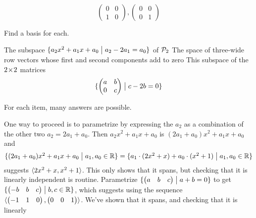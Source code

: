 \begin{exercises}
\begin{answer}
\begin{equation*}
{           \begin{pmatrix}
             0  &0  \\
             1  &0
           \end{pmatrix},
           \begin{pmatrix}
             0  &0  \\
             0  &1
           \end{pmatrix}  }
      \end{equation*} 
    \end{answer}
  \recommended \item 
      Find a basis for each.
      \begin{exparts}
        \partsitem The subspace $\mbox{$\{a_2x^2+a_1x+a_0\bigm| a_2-2a_1=a_0\}$}$ 
          of $\mathcal{P}_2$
        \partsitem The space of three-wide row vectors whose first and second
          components add to zero
        \partsitem This subspace of the $2 \! \times \! 2$ matrices
          \begin{equation*}
            \mbox{$\{\begin{pmatrix}
                   a  &b  \\
                   0  &c  
                 \end{pmatrix} \bigm| c-2b=0\}$}
          \end{equation*}
      \end{exparts}
      \begin{answer}
        For each item, many answers are possible.
        \begin{exparts}
          \partsitem One way to proceed is to parametrize by
            expressing the $a_2$ as a combination of the other two
            $a_2=2a_1+a_0$.
            Then
            $a_2x^2+a_1x+a_0$ is $(2a_1+a_0)x^2+a_1x+a_0$ and
            \begin{equation*} 
              \mbox{$\{(2a_1+a_0)x^2+a_1x+a_0\bigm| a_1,a_0\in\mathbb{R}\}$}
              =\mbox{$\{a_1\cdot(2x^2+x)+a_0\cdot(x^2+1)\bigm| a_1,a_0\in\mathbb{R}\}$}
            \end{equation*}
            suggests 
            $\langle2x^2+x,x^2+1\rangle$.
            This only shows that 
            it spans, but checking that it is linearly independent
            is routine.
          \partsitem Parametrize $\mbox{$\{\begin{pmatrix} a  &b  &c \end{pmatrix}\bigm| a+b=0\}$}$ 
            to get $\mbox{$\{\begin{pmatrix} -b &b &c \end{pmatrix}\bigm| b,c\in\mathbb{R}\}$}$, which suggests
            using the sequence $\langle\begin{pmatrix} -1 &1 &0 \end{pmatrix},\begin{pmatrix} 0 &0 &1 \end{pmatrix}\rangle$.
            We've shown that it spans, and checking that it is linearly 

\end{exparts}
\end{answer}
\end{exercises}
